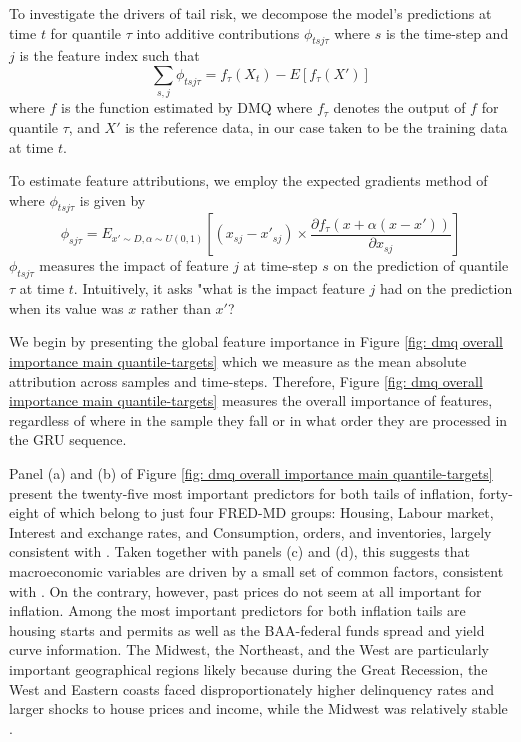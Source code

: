 \documentclass[12pt]{article}
\begin{document}
To investigate the drivers of tail risk, we decompose the model's predictions at time $t$ for quantile $\tau$ into additive contributions $\phi_{tsj\tau}$ where $s$ is the time-step and $j$ is the feature index such that 
\begin{equation}\label{eq: additivity}
  \sum_{s,j} \phi_{tsj\tau} = f_\tau(X_t) - E[f_\tau(X')]
\end{equation}
where $f$ is the function estimated by DMQ where $f_\tau$ denotes the output of $f$ for quantile $\tau$, and $X'$ is the reference data, in our case taken to be the training data at time $t$. 

To estimate feature attributions, we employ the expected gradients method of \cite{erionImprovingPerformanceDeep2021} where $\phi_{tsj\tau}$ is given by
\begin{equation}
  \phi_{sj\tau} = E_{x' \sim D, \alpha \sim U(0,1) } \left[ (x_{sj} - x'_{sj}) \times \frac{\partial f_\tau(x + \alpha (x-x'))}{\partial x_{sj}} \right]
\end{equation} 
$\phi_{tsj\tau}$ measures the impact of feature $j$ at time-step $s$ on the prediction of quantile $\tau$ at time $t$. Intuitively, it asks "what is the impact feature $j$ had on the prediction when its value was $x$ rather than $x'$?    

We begin by presenting the global feature importance in Figure \ref{fig: dmq overall importance main quantile-targets} which we measure as the mean absolute attribution across samples and time-steps. Therefore, Figure \ref{fig: dmq overall importance main quantile-targets} measures the overall importance of features, regardless of where in the sample they fall or in what order they are processed in the GRU sequence.  

Panel (a) and (b) of Figure \ref{fig: dmq overall importance main quantile-targets} present the twenty-five most important predictors for both tails of inflation, forty-eight of which belong to just four FRED-MD groups: Housing, Labour market, Interest and exchange rates, and Consumption, orders, and inventories, largely consistent with \cite{adrianMachinelearningGrowthRisk2025}. Taken together with panels (c) and (d), this suggests that macroeconomic variables are driven by a small set of common factors, consistent with \cite{stockMacroeconomicForecastingUsing2002}. On the contrary, however, past prices do not seem at all important for inflation. Among the most important predictors for both inflation tails are housing starts and permits as well as the BAA-federal funds spread and yield curve information. The Midwest, the Northeast, and the West are particularly important geographical regions likely because during the Great Recession, the West and Eastern coasts faced disproportionately higher delinquency rates and larger shocks to house prices and income, while the Midwest was relatively stable \citep{famigliettiGeographyHousingMarket2020}.  
\end{document}
